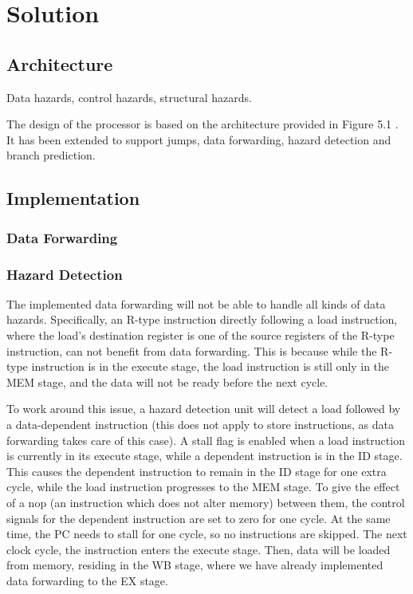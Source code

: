 \chapter{Solution}


\section{Architecture}

Data hazards, control hazards, structural hazards.

The design of the processor is based on the architecture provided in Figure 5.1 \cite[p. 50]{compendium}.
It has been extended to support jumps, data forwarding, hazard detection and branch prediction.

\section{Implementation}

\subsection{Data Forwarding}

\subsection {Hazard Detection}
The implemented data forwarding will not be able to handle all kinds of data hazards.
Specifically, an R-type instruction directly following a load instruction, where the load's destination register is one of the source registers of the R-type instruction, can not benefit from data forwarding.
This is because while the R-type instruction is in the execute stage, the load instruction is still only in the MEM stage, and the data will not be ready before the next cycle.

To work around this issue, a hazard detection unit will detect a load followed by a data-dependent instruction (this does not apply to store instructions, as data forwarding takes care of this case).
A stall flag is enabled when a load instruction is currently in its execute stage, while a dependent instruction is in the ID stage.
This causes the dependent instruction to remain in the ID stage for one extra cycle, while the load instruction progresses to the MEM stage.
To give the effect of a nop (an instruction which does not alter memory) between them, the control signals for the dependent instruction are set to zero for one cycle.
At the same time, the PC needs to stall for one cycle, so no instructions are skipped.
The next clock cycle, the instruction enters the execute stage.
Then, data will be loaded from memory, residing in the WB stage, where we have already implemented data forwarding to the EX stage.


